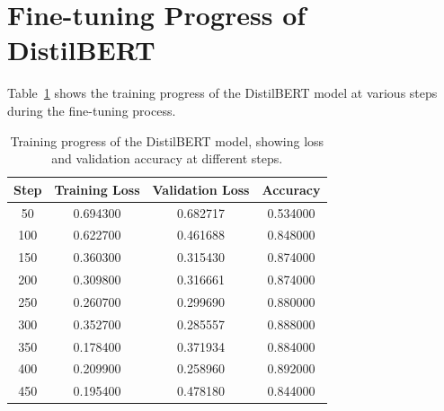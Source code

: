 \documentclass[11pt]{article}
\begin{document}
\section{Fine-tuning Progress of DistilBERT}
\label{sec:appendix}

Table~\ref{tab:training-progress} shows the training progress of the DistilBERT model at various steps during the fine-tuning process.

\begin{table}[htbp]
  \centering
  \begin{tabular}{cccc}
  \toprule
  \textbf{Step} & \textbf{Training Loss} & \textbf{Validation Loss} & \textbf{Accuracy} \\
  \midrule
  50 & 0.694300 & 0.682717 & 0.534000 \\
  100 & 0.622700 & 0.461688 & 0.848000 \\
  150 & 0.360300 & 0.315430 & 0.874000 \\
  200 & 0.309800 & 0.316661 & 0.874000 \\
  250 & 0.260700 & 0.299690 & 0.880000 \\
  300 & 0.352700 & 0.285557 & 0.888000 \\
  350 & 0.178400 & 0.371934 & 0.884000 \\
  400 & 0.209900 & 0.258960 & 0.892000 \\
  450 & 0.195400 & 0.478180 & 0.844000 \\
  \bottomrule
  \end{tabular}
  \caption{Training progress of the DistilBERT model, showing loss and validation accuracy at different steps.}
  \label{tab:training-progress}
  \end{table}
\end{document}
